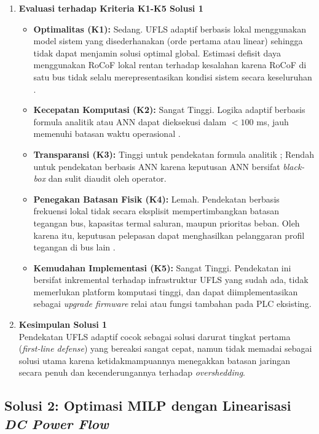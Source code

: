 \begin{enumerate}
\item[b.] \textbf{Evaluasi terhadap Kriteria K1-K5 Solusi 1}
\begin{itemize}
    \item[i.] \textbf{Optimalitas (K1):} Sedang. UFLS adaptif berbasis lokal menggunakan model sistem yang disederhanakan (orde pertama atau linear) sehingga tidak dapat menjamin solusi optimal global. Estimasi defisit daya menggunakan RoCoF lokal rentan terhadap kesalahan karena RoCoF di satu bus tidak selalu merepresentasikan kondisi sistem secara keseluruhan \cite{Parniani2006}.
    \item[ii.] \textbf{Kecepatan Komputasi (K2):} Sangat Tinggi. Logika adaptif berbasis formula analitik atau ANN dapat dieksekusi dalam $< 100$ ms, jauh memenuhi batasan waktu operasional \cite{Jinhua2022}.
    \item[iii.] \textbf{Transparansi (K3):} Tinggi untuk pendekatan formula analitik \cite{Xiong2006, Zhu2021, Parniani2006}; Rendah untuk pendekatan berbasis ANN \cite{Jinhua2022} karena keputusan ANN bersifat \textit{black-box} dan sulit diaudit oleh operator.
    \item[iv.] \textbf{Penegakan Batasan Fisik (K4):} Lemah. Pendekatan berbasis frekuensi lokal tidak secara eksplisit mempertimbangkan batasan tegangan bus, kapasitas termal saluran, maupun prioritas beban. Oleh karena itu, keputusan pelepasan dapat menghasilkan pelanggaran profil tegangan di bus lain \cite{Zhu2021}.
    \item[v.] \textbf{Kemudahan Implementasi (K5):} Sangat Tinggi. Pendekatan ini bersifat inkremental terhadap infrastruktur UFLS yang sudah ada, tidak memerlukan platform komputasi tinggi, dan dapat diimplementasikan sebagai \textit{upgrade firmware} relai atau fungsi tambahan pada PLC eksisting.
\end{itemize}

\item[c.] \textbf{Kesimpulan Solusi 1} \\
Pendekatan UFLS adaptif cocok sebagai solusi darurat tingkat pertama (\textit{first-line defense}) yang bereaksi sangat cepat, namun tidak memadai sebagai solusi utama karena ketidakmampuannya menegakkan batasan jaringan secara penuh dan kecenderungannya terhadap \textit{overshedding}.
\end{enumerate}

\subsection{Solusi 2: Optimasi MILP dengan Linearisasi \textit{DC Power Flow}}
\label{subsec:Solusi_2}

